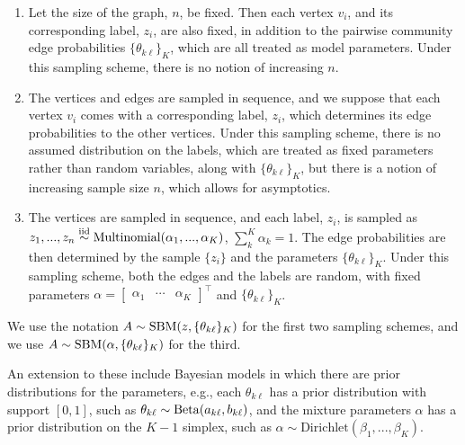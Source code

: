 \documentclass[
  11pt,
]{article}
\providecommand{\tightlist}{%
  \setlength{\itemsep}{0pt}\setlength{\parskip}{0pt}}
\theoremstyle{definition}
\theoremstyle{definition}
\theoremstyle{definition}
\theoremstyle{definition}
\theoremstyle{remark}
\begin{document}
\begin{enumerate}
\def\labelenumi{\arabic{enumi}.}
\tightlist
\item
  Let the size of the graph, \(n\), be fixed.
  Then each vertex \(v_i\), and its corresponding label, \(z_i\), are also fixed, in addition to the pairwise community edge probabilities \(\{\theta_{k \ell}\}_K\), which are all treated as model parameters.
  Under this sampling scheme, there is no notion of increasing \(n\).
\item
  The vertices and edges are sampled in sequence, and we suppose that each vertex \(v_i\) comes with a corresponding label, \(z_i\), which determines its edge probabilities to the other vertices.
  Under this sampling scheme, there is no assumed distribution on the labels, which are treated as fixed parameters rather than random variables, along with \(\{\theta_{k \ell}\}_K\), but there is a notion of increasing sample size \(n\), which allows for asymptotics.
\item
  The vertices are sampled in sequence, and each label, \(z_i\), is sampled as \(z_1, ..., z_n \stackrel{\mathrm{iid}}{\sim} \mathrm{Multinomial}(\alpha_1, ..., \alpha_K)\), \(\sum_k^K \alpha_k = 1\).
  The edge probabilities are then determined by the sample \(\{z_i\}\) and the parameters \(\{\theta_{k \ell}\}_K\).
  Under this sampling scheme, both the edges and the labels are random, with fixed parameters \(\alpha = \begin{bmatrix} \alpha_1 & \cdots & \alpha_K \end{bmatrix}^\top\) and \(\{\theta_{k \ell}\}_K\).
\end{enumerate}

We use the notation \(A \sim \mathrm{SBM}(z, \{\theta_{k \ell}\}_K)\) for the first two sampling schemes, and we use \(A \sim \mathrm{SBM}(\alpha, \{\theta_{k \ell}\}_K)\) for the third.

An extension to these include Bayesian models in which there are prior distributions for the parameters, e.g., each \(\theta_{k \ell}\) has a prior distribution with support \([0, 1]\), such as \(\theta_{k \ell} \sim \mathrm{Beta}(a_{k \ell}, b_{k \ell})\), and the mixture parameters \(\alpha\) has a prior distribution on the \(K-1\) simplex, such as \(\alpha \sim \mathrm{Dirichlet}(\beta_1, ..., \beta_K)\).
\end{document}
